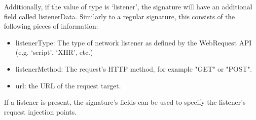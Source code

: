 Additionally, if the value of type is `listener', the signature will have an additional field called listenerData. Similarly to a regular signature, this consists of the following pieces of information:
\begin{itemize}
	\item 
	listenerType: The type of network listener as defined by the WebRequest API (e.g. `script', `XHR', etc.)
	\item
	listenerMethod: The request's HTTP method, for example "GET" or "POST".
	\item
	url: the URL of the request target.
\end{itemize}
If a listener is present, the signature's fields can be used to specify the listener's request injection points.

